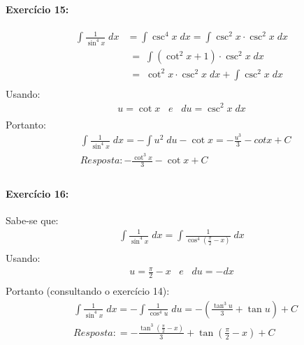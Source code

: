 \documentclass[12pt]{article}
\begin{document}

\paragraph{Exercício 15:}
\begin{align*}
\int \frac{1}{\sin^{4}x}\;dx &= \int \csc ^{4}x\;dx = \int\csc^{2}x\cdot \csc^{2}x\;dx\\
&\;=\;\int\left ( \cot ^{2}x+1 \right )\cdot\csc^{2}x\;dx\\
&\;=\;\cot ^{2}x\cdot \csc^{2}x\;dx+\int\csc^{2}x\;dx\\
\end{align*}
Usando:
\begin{align*}
u = \cot x \;\;\;e\;\;\; du = \csc^{2}x\;dx\\
\end{align*}
Portanto:
\begin{align*}
&\int \frac{1}{\sin^{4}x}\;dx = -\int u^{2}\;du - \cot x = -\frac{u^{3}}{3} - cot x + C\\
&Resposta: -\frac{\cot ^{3}x}{3} - \cot x + C\\
\end{align*}


\paragraph{Exercício 16:}
Sabe-se que:
\begin{align*}
\int \frac{1}{\sin^{4}x}\;dx = \int\frac{1}{\cos^{4}\left ( \frac{\pi}{2}-x \right )}\;dx\\
\end{align*}
Usando:
\begin{align*}
u = \frac{\pi}{2}-x \;\;\;e\;\;\; du = -dx\\
\end{align*}
Portanto (consultando o exercício 14):
\begin{align*}
&\int \frac{1}{\sin^{4}x}\;dx = -\int\frac{1}{\cos^{4}u}\;du
= -\left ( \frac{\tan^{3}u}{3}+\tan u \right ) + C\\ 
&Resposta: = -\frac{\tan^{3}\left ( \frac{\pi}{2}-x \right )}{3}+\tan \left (\frac{\pi}{2}-x  \right ) + C\\
\end{align*}

\end{document}
